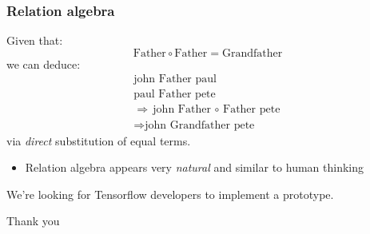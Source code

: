 \documentclass[17pt]{beamer}
\begin{document}


\begin{frame}
\frametitle{Relation algebra}
Given that:
\begin{equation}
\mbox{Father} \circ \mbox{Father} = \mbox{Grandfather}
\end{equation}
we can deduce:
\begin{eqnarray}
\mbox{john Father paul} \\
\mbox{paul Father pete} \\
\Rightarrow \mbox{john Father $\circ$ Father pete} \\
\Rightarrow \mbox{john Grandfather pete}
\end{eqnarray}
via \textit{direct} substitution of equal terms.
\begin{itemize}
	\item  Relation algebra appears very \textit{natural} and similar to human thinking
\end{itemize}
\end{frame}

\begin{frame}
We're looking for Tensorflow developers to implement a prototype.

\vspace*{1cm}
\Large{\centerline{Thank you}}

\end{frame}
\end{document}
